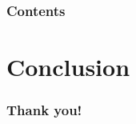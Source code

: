 \documentclass[aspectratio=169]{beamer}
\title[\tc]{\deliv{\sds}{Presentation}}
\date{\datesds}
\begin{document}

\begin{frame}
\maketitle
\begin{center}
\names
\end{center}
\end{frame}

\begin{frame}
\frametitle{Contents}
\setlength{\columnsep}{0.11in}
\tableofcontents
\end{frame}









\section{Conclusion}
\begin{frame}
\frametitle{Thank you!}
\crygithub
\end{frame}

\end{document}
